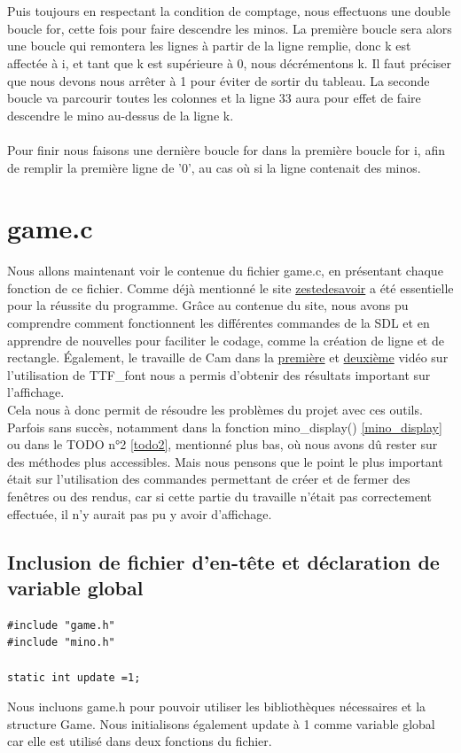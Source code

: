 \documentclass[a4paper,10p]{report}
\begin{document}
\\\\
Puis toujours en respectant la condition de comptage, nous effectuons une double boucle for, cette fois pour faire descendre les minos. La première boucle sera alors une boucle qui remontera les lignes à partir de la ligne remplie, donc k est affectée à i, et tant que k est supérieure à 0, nous décrémentons k. Il faut préciser que nous devons nous arrêter à 1 pour éviter de sortir du tableau. La seconde boucle va parcourir toutes les colonnes et la ligne \textcolor{gris}{33} aura pour effet de faire descendre le mino au-dessus de la ligne k.
\\\\Pour finir nous faisons une dernière boucle for dans la première boucle for i, afin de remplir la première ligne de '0', au cas où si la ligne contenait des minos.

\section{game.c}
\label{game.c}
Nous allons maintenant voir le contenue du fichier game.c, en présentant chaque fonction de ce fichier. Comme déjà mentionné le site \href{https://zestedesavoir.com/tutoriels/1014/utiliser-la-sdl-en-langage-c/}{zestedesavoir} a été essentielle pour la réussite du programme. Grâce au contenue du site, nous avons pu comprendre comment fonctionnent les différentes commandes de la SDL et en apprendre de nouvelles pour faciliter le codage, comme la création de ligne et de rectangle. Également, le travaille de Cam dans la \href{https://www.youtube.com/watch?v=NQZNHUoba-8&t=458s}{première} et \href{https://www.youtube.com/watch?v=LS_eeI-9-pA&t=11s}{deuxième} vidéo sur l'utilisation de TTF\_font nous a permis d'obtenir des résultats important sur l'affichage.
\\Cela nous à donc permit de résoudre les problèmes du projet avec ces outils. Parfois sans succès, notamment dans la fonction mino\_display() \ref{mino_display} ou dans le TODO n°2 \ref{todo2}, mentionné plus bas, où nous avons dû rester sur des méthodes plus accessibles. Mais nous pensons que le point le plus important était sur l'utilisation des commandes permettant de créer et de fermer des fenêtres ou des rendus, car si cette partie du travaille n'était pas correctement effectuée, il n'y aurait pas pu y avoir d'affichage.
\subsection{Inclusion de fichier d'en-tête et déclaration de variable global}
\label{debut_game}
\begin{lstlisting}
#include "game.h"
#include "mino.h"

static int update =1;
\end{lstlisting}
Nous incluons game.h pour pouvoir utiliser les bibliothèques nécessaires et la structure Game. Nous initialisons également update à 1 comme variable global car elle est utilisé dans deux fonctions du fichier.
\end{document}
